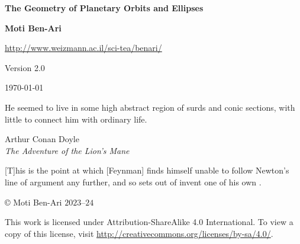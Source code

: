 


\thispagestyle{empty}

\begin{center}
\textbf{\LARGE The Geometry of Planetary Orbits and Ellipses}

\bigskip
\bigskip
\bigskip

\textbf{\Large Moti Ben-Ari}

\bigskip

\url{http://www.weizmann.ac.il/sci-tea/benari/}

\bigskip

Version 2.0

\bigskip

\today

\end{center}

\vspace*{8ex}

\hfill\begin{minipage}{.5\textwidth}
\small He seemed to live in some high abstract region of surds and conic sections, with little to connect him with ordinary life.
\begin{flushright}
Arthur Conan Doyle\\\textit{The Adventure of the Lion’s Mane}
\end{flushright}
\end{minipage}

\vspace*{8ex}

\hfill\begin{minipage}{.5\textwidth}
[T]his is the point at which [Feynman] finds himself unable to follow Newton's line of argument any further, and so sets out of invent one of his own \cite[p.~111]{lost}.
\end{minipage}

\vfill

\begin{center}
\copyright{} Moti Ben-Ari $2023$--$24$
\end{center}
 
\begin{small}
This work is licensed under Attribution-ShareAlike 4.0 International. To view a copy of this license, visit \url{http://creativecommons.org/licenses/by-sa/4.0/}.
\end{small}

